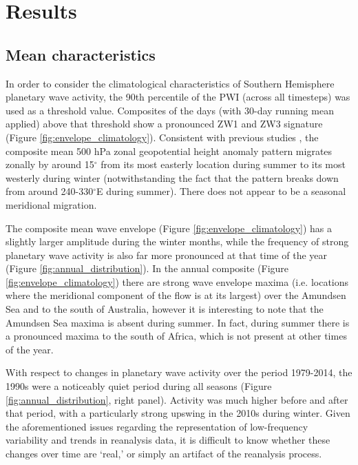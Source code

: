 \section{Results}

\subsection{Mean characteristics}

In order to consider the climatological characteristics of Southern Hemisphere planetary wave activity, the 90th percentile of the PWI (across all timesteps) was used as a threshold value. Composites of the days (with 30-day running mean applied) above that threshold show a pronounced ZW1 and ZW3 signature (Figure \ref{fig:envelope_climatology}). Consistent with previous studies \citep{vanLoon1984,Mo1985}, the composite mean 500 hPa zonal geopotential height anomaly pattern migrates zonally by around 15$^{\circ}$ from its most easterly location during summer to its most westerly during winter (notwithstanding the fact that the pattern breaks down from around 240-330$^{\circ}$E during summer). There does not appear to be a seasonal meridional migration.

The composite mean wave envelope (Figure \ref{fig:envelope_climatology}) has a slightly larger amplitude during the winter months, while the frequency of strong planetary wave activity is also far more pronounced at that time of the year (Figure \ref{fig:annual_distribution}). In the annual composite (Figure \ref{fig:envelope_climatology}) there are strong wave envelope maxima (i.e. locations where the meridional component of the flow is at its largest) over the Amundsen Sea and to the south of Australia, however it is interesting to note that the Amundsen Sea maxima is absent during summer. In fact, during summer there is a pronounced maxima to the south of Africa, which is not present at other times of the year.

With respect to changes in planetary wave activity over the period 1979-2014, the 1990s were a noticeably quiet period during all seasons (Figure \ref{fig:annual_distribution}, right panel). Activity was much higher before and after that period, with a particularly strong upswing in the 2010s during winter. Given the aforementioned issues regarding the representation of low-frequency variability and trends in reanalysis data, it is difficult to know whether these changes over time are `real,' or simply an artifact of the reanalysis process.

